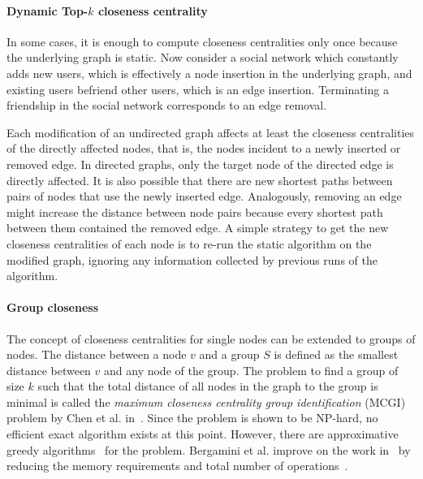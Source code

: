 
\paragraph{Dynamic Top-$k$ closeness centrality}

In some cases, it is enough to compute closeness centralities only once because the underlying graph is static. Now consider a social network which constantly adds new users, which is effectively a node insertion in the underlying graph, and existing users befriend other users, which is an edge insertion. Terminating a friendship in the social network corresponds to an edge removal.

Each modification of an undirected graph affects at least the closeness centralities of the directly affected nodes, that is, the nodes incident to a newly inserted or removed edge. In directed graphs, only the target node of the directed edge is directly affected. It is also possible that there are new shortest paths between pairs of nodes that use the newly inserted edge. Analogously, removing an edge might increase the distance between node pairs because every shortest path between them contained the removed edge. A simple strategy to get the new closeness centralities of each node is to re-run the static algorithm on the modified graph, ignoring any information collected by previous runs of the algorithm.

\paragraph{Group closeness}
The concept of closeness centralities for single nodes can be extended to groups of nodes. The distance between a node $v$ and a group $S$ is defined as the smallest distance between $v$ and any node of the group. The problem to find a group of size $k$ such that the total distance of all nodes in the graph to the group is minimal is called the \emph{maximum closeness centrality group identification} (MCGI) problem by Chen et al. in~\cite{Chen2016}. Since the problem is shown to be NP-hard, no efficient exact algorithm exists at this point. However, there are approximative greedy algorithms~\cite{Chen2016,zhao2014measuring} for the problem. Bergamini et al. improve on the work in~\cite{Chen2016} by reducing the memory requirements and total number of operations~\cite{bergaminiGroupCloseness}.


